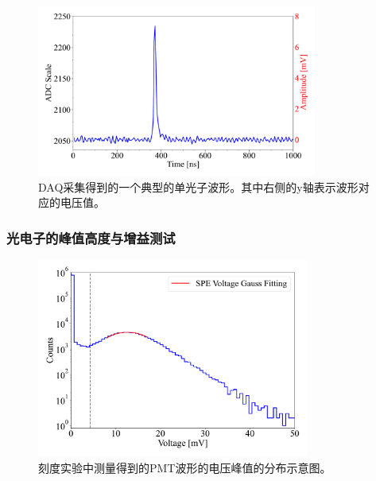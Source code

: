 \begin{figure}[htb]
    \centering
    \includegraphics[width= 0.82\textwidth]{img/pmt_spe_waveform.pdf}
    \caption{DAQ采集得到的一个典型的单光子波形。其中右侧的y轴表示波形对应的电压值。}
    \label{fig:pmt_spe_waveform}
\end{figure}

\subsubsection{光电子的峰值高度与增益测试}

\begin{figure}[!ht]
    \centering
    \includegraphics[width= 0.80\textwidth]{img/pmt_peak_voltage_distribution.pdf}
    \caption{
    刻度实验中测量得到的PMT波形的电压峰值的分布示意图。}
    \label{fig:pmt_peak_voltage_distribution}
\end{figure}

